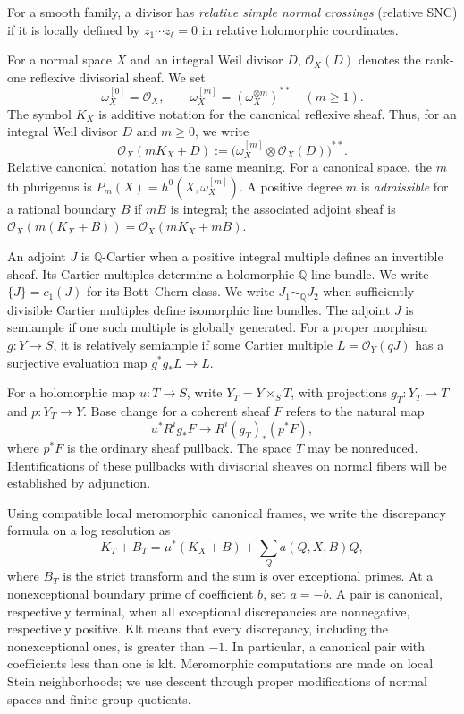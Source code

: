\documentclass[11pt,a4paper]{article}
\numberwithin{equation}{section}
\theoremstyle{definition}
\theoremstyle{remark}
\newcommand{\Q}{\mathbb Q}\newcommand{\R}{\mathbb R}
\newcommand{\OO}{\mathcal O}\newcommand{\cX}{\mathcal X}
\begin{document}
For a smooth family, a divisor has \emph{relative simple normal
crossings} (relative SNC) if it is locally defined by
$z_1\cdots z_\ell=0$ in relative holomorphic coordinates.

For a normal space $X$ and an integral Weil divisor $D$, $\OO_X(D)$
denotes the rank-one reflexive divisorial sheaf. We set
\[
 \omega_X^{[0]}=\OO_X,\qquad
 \omega_X^{[m]}=(\omega_X^{\otimes m})^{**}\quad(m\ge1).
\]
The symbol $K_X$ is additive notation for the canonical reflexive
sheaf. Thus, for an integral Weil divisor $D$ and $m\ge0$, we write
\[
 \OO_X(mK_X+D)
 :=\bigl(\omega_X^{[m]}\otimes\OO_X(D)\bigr)^{**}.
\]
Relative canonical notation has the same meaning. For a canonical
space, the $m$th plurigenus is $P_m(X)=h^0(X,\omega_X^{[m]})$.
A positive degree $m$ is \emph{admissible} for a rational boundary $B$
if $mB$ is integral; the associated adjoint sheaf is
$\OO_X(m(K_X+B))=\OO_X(mK_X+mB)$.

An adjoint $J$ is $\Q$-Cartier when a positive integral multiple
defines an invertible sheaf. Its Cartier multiples determine a
holomorphic $\Q$-line bundle. We write $\{J\}=c_1(J)$ for its
Bott--Chern class. We write $J_1\sim_{\Q}J_2$ when sufficiently
divisible Cartier multiples define isomorphic line bundles.
The adjoint $J$ is semiample if one such multiple is globally generated.
For a proper morphism $g:Y\to S$, it is relatively semiample if some
Cartier multiple $L=\OO_Y(qJ)$ has a surjective evaluation map
$g^*g_*L\to L$.

For a holomorphic map $u:T\to S$, write $Y_T=Y\times_S T$, with
projections $g_T:Y_T\to T$ and $p:Y_T\to Y$. Base change for a coherent
sheaf $F$ refers to the natural map
\[
 u^*R^ig_*F\longrightarrow R^i(g_T)_*(p^*F),
\]
where $p^*F$ is the ordinary sheaf pullback. The space $T$ may be
nonreduced. Identifications of these pullbacks with divisorial sheaves
on normal fibers will be established by adjunction.

Using compatible local meromorphic canonical frames, we write the
discrepancy formula on a log resolution as
\[
 K_T+B_T=\mu^*(K_X+B)+\sum_Q a(Q,X,B)Q,
\]
where $B_T$ is the strict transform and the sum is over exceptional
primes. At a nonexceptional boundary prime of coefficient $b$, set
$a=-b$. A pair is canonical, respectively terminal, when all exceptional
discrepancies are nonnegative, respectively positive. Klt means that
every discrepancy, including the nonexceptional ones, is greater than
$-1$. In particular, a canonical pair with coefficients less than one
is klt. Meromorphic computations are made on local Stein neighborhoods;
we use descent through proper modifications of normal spaces and finite
group quotients.
\end{document}
